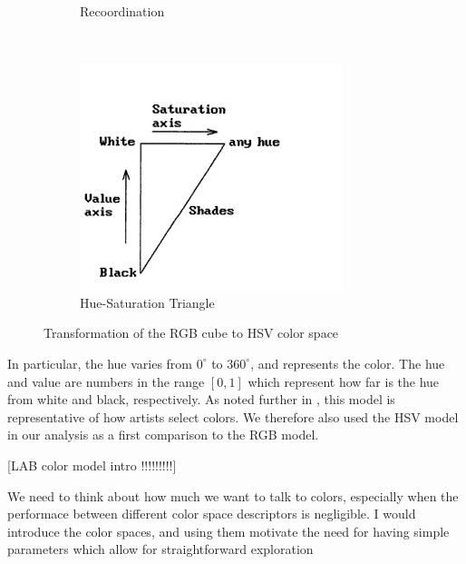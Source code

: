 \documentclass{report}
\begin{document}
\begin{figure}[hbtp]
\begin{subfigure}[b]{0.3\textwidth}
                \caption{Recoordination}
                \label{fig:mouse}
        \end{subfigure}
        ~
        \begin{subfigure}[b]{0.3\textwidth}
                \includegraphics[width=\textwidth]{graphics/hsv_rescale2.png}
                \caption{Hue-Saturation Triangle}
                \label{fig:tiger}
        \end{subfigure}
        \caption{Transformation of the RGB cube to HSV color space}\label{fig:hsv_visualisation}
\end{figure}
In particular, the hue varies from $0^{\circ}$ to $360^{\circ}$, and represents the color. The hue and value are numbers in the range $[0,1]$ which represent how far is the hue from white and black, respectively. As noted further in \cite{color_model_ref}, this model is representative of how artists select colors. We therefore also used the HSV model in our analysis as a first comparison to the RGB model.

[LAB color model intro !!!!!!!!!]

{\color{red} We need to think about how much we want to talk to colors, especially when the performace between different color space descriptors is negligible. I would introduce the color spaces, and using them motivate the need for having simple parameters which allow for straightforward exploration }
\end{document}
